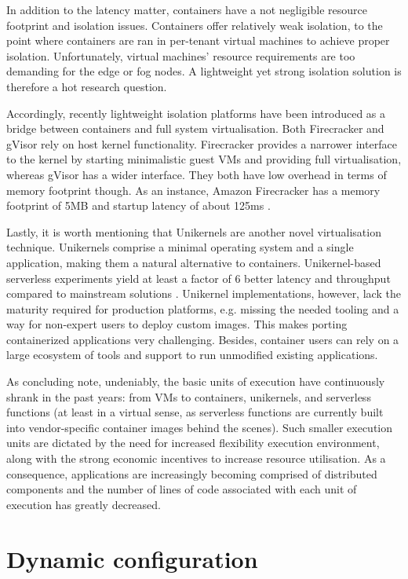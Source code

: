 In addition to the latency matter, containers have a not negligible resource footprint and isolation issues. Containers offer relatively weak isolation, to the point where containers are ran in per-tenant virtual machines to achieve proper isolation. Unfortunately, virtual machines' resource requirements are too demanding for the edge or fog nodes. A lightweight yet strong isolation solution is therefore a hot research question.

Accordingly, recently lightweight isolation platforms have been introduced as a bridge between containers and full system virtualisation. Both Firecracker and gVisor \cite{gvisor-firecracker} rely on host kernel functionality. Firecracker provides a narrower interface to the kernel by starting minimalistic guest VMs and providing full virtualisation, whereas gVisor has a wider interface. They both have low overhead in terms of memory footprint though. As an instance, Amazon Firecracker has a memory footprint of 5MB and startup latency of about 125ms \cite{firecracker}.

Lastly, it is worth mentioning that Unikernels \cite{unikernels} are another novel virtualisation technique. Unikernels comprise a minimal operating system and a single application, making them a natural alternative to containers. Unikernel-based serverless experiments yield at least a factor of 6 better latency and throughput compared to mainstream solutions \cite{unikernels-performance}. Unikernel implementations, however, lack the maturity required for production platforms, e.g. missing the needed tooling and a way for non-expert users to deploy custom images. This makes porting containerized applications very challenging. Besides, container users can rely on a large ecosystem of tools and support to run unmodified existing applications.

As concluding note, undeniably, the basic units of execution have continuously shrank in the past years: from VMs to containers, unikernels, and serverless functions (at least in a virtual sense, as serverless functions are currently built into vendor-specific container images behind the scenes). Such smaller execution units are dictated by the need for increased flexibility execution environment, along with the strong economic incentives to increase resource utilisation. As a consequence, applications are increasingly becoming comprised of distributed components and the number of lines of code associated with each unit of execution has greatly decreased.

\section{Dynamic configuration}

